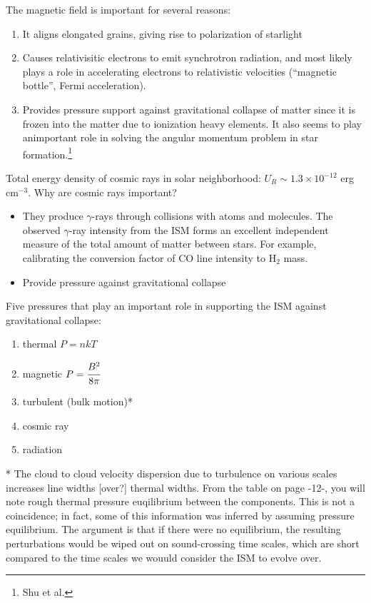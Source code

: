 \documentclass[12pt]{article}
\newcommand{\mar}[1]{\hspace{0pt}\marginpar{-\textcolor{black}{#1}-}}
\begin{document}
The magnetic field is important for several reasons:
\begin{enumerate}
    \item It aligns elongated grains, giving rise to polarization
        of starlight
    \item Causes relativisitic electrons to emit synchrotron radiation,
        and most likely plays a role in accelerating electrons to
        relativistic velocities (``magnetic bottle'', Fermi acceleration).
    \item Provides pressure support against gravitational collapse of matter
        since it is frozen into the matter due to ionization heavy elements.
        It also seems to play animportant role in solving the angular momentum
        problem in star formation.\footnote{Shu et al.}
\end{enumerate}

Total energy density of cosmic rays in solar neighborhood:
$U_{R} \sim 1.3\times10^{-12}$ erg cm$^{-3}$.
\mar{14}Why are cosmic rays important?
\begin{itemize}
    \item They produce $\gamma$-rays through collisions with atoms and
        molecules. The observed $\gamma$-ray intensity from the ISM forms
        an excellent independent measure of the total amount of matter
        between stars. For example, calibrating the conversion factor of
        CO line intensity to H$_{2}$ mass.
    \item Provide pressure against gravitational collapse
\end{itemize}
Five pressures that play an important role in supporting the ISM against
gravitational collapse:
\begin{enumerate}
    \item thermal $P=nkT$
    \item magnetic $P=\cfrac{B^{2}}{8\pi}$
    \item turbulent (bulk motion)*
    \item cosmic ray
    \item radiation
\end{enumerate}
* The cloud to cloud velocity dispersion due to turbulence on various
scales increases line widths [over?] thermal widths. From the table
on page -12-, you will note rough thermal pressure euqilibrium between
the components. This is not a coincidence; in fact, some of this
information was inferred by assuming pressure equilibrium. The
argument is that if there were no equilibrium, the resulting
perturbations would be wiped out on sound-crossing time scales, which
are short compared to\mar{15} the time scales we wouuld
consider the ISM to evolve over.
\end{document}
